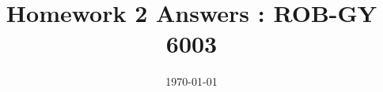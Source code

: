 \documentclass[a4paper]{article}
\title{Homework 2 Answers : ROB-GY 6003}
\author{\myName}
\date{\today}
\newcommand{\myName}{\textbf{Shantanu Ghodgaonkar}\\\textit{Univ ID}: N11344563\\\textit{Net ID}: sng8399\\\textit{Ph.No.}: +1 (929) 922-0614}
\begin{document}
	
	
	\begin{qalist}			
%		
%		
%		
%		
%		
%		
%		

\end{qalist}
\end{document}
